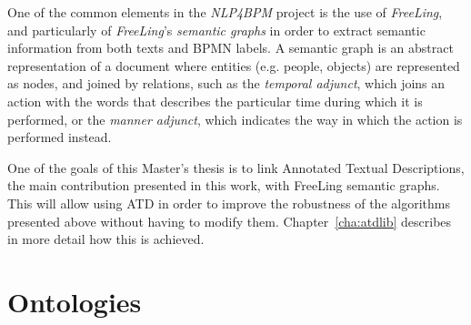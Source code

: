 One of the common elements in the \emph{NLP4BPM} project is the use of
\emph{FreeLing}, and particularly of \emph{FreeLing}'s \emph{semantic graphs} in
order to extract semantic information from both texts and BPMN labels. A
semantic graph is an abstract representation of a document where entities (e.g.
people, objects) are represented as nodes, and joined by relations, such as the
\emph{temporal adjunct}, which joins an action with the words that describes the
particular time during which it is performed, or the \emph{manner adjunct},
which indicates the way in which the action is performed instead.

One of the goals of this Master's thesis is to link Annotated Textual
Descriptions, the main contribution presented in this work, with FreeLing
semantic graphs. This will allow using ATD in order to improve the robustness of
the algorithms presented above without having to modify them.
Chapter~\ref{cha:atdlib} describes in more detail how this is achieved.




\section{Ontologies}
\label{sec:background_ontologies}


